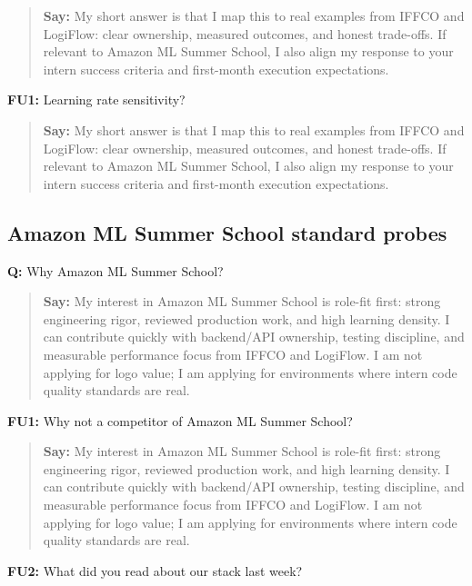 \documentclass[9pt,a4paper]{article}
\begin{document}
\begin{quote}\small\textbf{Say:} My short answer is that I map this to real examples from IFFCO and LogiFlow: clear ownership, measured outcomes, and honest trade-offs. If relevant to Amazon ML Summer School, I also align my response to your intern success criteria and first-month execution expectations.\end{quote}
\vspace{2mm}
\textbf{FU1:} Learning rate sensitivity?

\begin{quote}\small\textbf{Say:} My short answer is that I map this to real examples from IFFCO and LogiFlow: clear ownership, measured outcomes, and honest trade-offs. If relevant to Amazon ML Summer School, I also align my response to your intern success criteria and first-month execution expectations.\end{quote}
\vspace{2mm}
\subsection{Amazon ML Summer School standard probes}
\textbf{Q:} Why Amazon ML Summer School?

\begin{quote}\small\textbf{Say:} My interest in Amazon ML Summer School is role-fit first: strong engineering rigor, reviewed production work, and high learning density. I can contribute quickly with backend/API ownership, testing discipline, and measurable performance focus from IFFCO and LogiFlow. I am not applying for logo value; I am applying for environments where intern code quality standards are real.\end{quote}
\vspace{2mm}
\textbf{FU1:} Why not a competitor of Amazon ML Summer School?

\begin{quote}\small\textbf{Say:} My interest in Amazon ML Summer School is role-fit first: strong engineering rigor, reviewed production work, and high learning density. I can contribute quickly with backend/API ownership, testing discipline, and measurable performance focus from IFFCO and LogiFlow. I am not applying for logo value; I am applying for environments where intern code quality standards are real.\end{quote}
\vspace{2mm}
\textbf{FU2:} What did you read about our stack last week?
\end{document}
